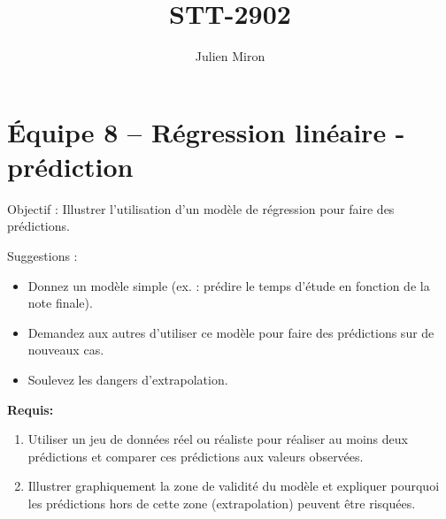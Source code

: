 \documentclass{article}
\title{STT-2902}
\author{Julien Miron}
\begin{document}
\section*{Équipe 8 – Régression linéaire - prédiction}

Objectif : Illustrer l'utilisation d'un modèle de régression pour faire des prédictions.


\vspace{1cm}
Suggestions :
\begin{itemize}
    \item Donnez un modèle simple (ex. : prédire le temps d’étude en fonction de la note finale).
    \item Demandez aux autres d’utiliser ce modèle pour faire des prédictions sur de nouveaux cas.
    \item Soulevez les dangers d’extrapolation.


\end{itemize}

\vspace{1cm}

\textbf{Requis:}

\begin{enumerate}
    \item Utiliser un jeu de données réel ou réaliste pour réaliser au moins deux prédictions et comparer ces prédictions aux valeurs observées.
    \item Illustrer graphiquement la zone de validité du modèle et expliquer pourquoi les prédictions hors de cette zone (extrapolation) peuvent être risquées.
\end{enumerate}
\end{document}
